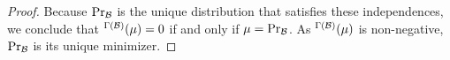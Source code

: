 \documentclass{article}
\theoremstyle{plain}
\theoremstyle{definition}
\theoremstyle{remark}
\let\H\relax
\DeclareMathOperator{\H}{\mathrm{H}} %
\newcommand\PDGof{\Gamma}
\numberwithin{equation}{section}
\begin{document}
\begin{proof}
		Because $\Pr_{\cal B}$ is the unique distribution that satisfies these independences, we conclude that $\H^{\PDGof(\cal B)}(\mu) = 0$ if and only if $\mu = \Pr_{\cal B}$. 	
		As $\H^{\PDGof(\cal B)}(\mu)$ is non-negative, $\Pr_{\cal B}$ is its unique minimizer. 
		
		
	\end{proof}
\end{document}
